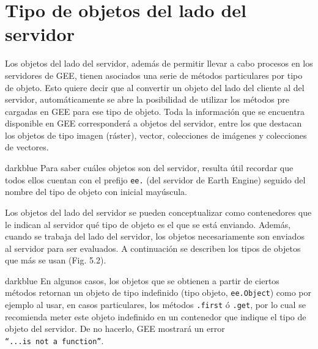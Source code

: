 \documentclass[
  12pt,
  letterpaper,
  twoside]{book}
\begin{document}
\hypertarget{tipo-de-objetos-del-lado-del-servidor}{%
\section{Tipo de objetos del lado del servidor}\label{tipo-de-objetos-del-lado-del-servidor}}

Los objetos del lado del servidor, además de permitir llevar a cabo procesos en los servidores de GEE, tienen asociados una serie de métodos particulares por tipo de objeto. Esto quiere decir que al convertir un objeto del lado del cliente al del servidor, automáticamente se abre la posibilidad de utilizar los métodos pre cargadas en GEE para ese tipo de objeto. Toda la información que se encuentra disponible en GEE corresponderá a objetos del servidor, entre los que destacan los objetos de tipo imagen (ráster), vector, colecciones de imágenes y colecciones de vectores.

\begin{bluebox2}

\begin{awesomeblock}{5pt}{\faLightbulb}{darkblue}
Para saber cuáles objetos son del servidor, resulta útil recordar que todos ellos cuentan con el prefijo \texttt{ee.} (del servidor de Earth Engine) seguido del nombre del tipo de objeto con inicial mayúscula.

\end{awesomeblock}

\end{bluebox2}

Los objetos del lado del servidor se pueden conceptualizar como contenedores que le indican al servidor qué tipo de objeto es el que se está enviando. Además, cuando se trabaja del lado del servidor, los objetos necesariamente son enviados al servidor para ser evaluados. A continuación se describen los tipos de objetos que más se usan (Fig. 5.2).

\begin{bluebox2}

\begin{awesomeblock}{5pt}{\faLightbulb}{darkblue}
En algunos casos, los objetos que se obtienen a partir de ciertos métodos retornan un objeto de tipo indefinido (tipo objeto, \texttt{ee.Object}) como por ejemplo al usar, en casos particulares, los métodos \texttt{.first} ó \texttt{.get}, por lo cual se recomienda meter este objeto indefinido en un contenedor que indique el tipo de objeto del servidor. De no hacerlo, GEE mostrará un error \texttt{“...is\ not\ a\ function”}.

\end{awesomeblock}

\end{bluebox2}
\end{document}
